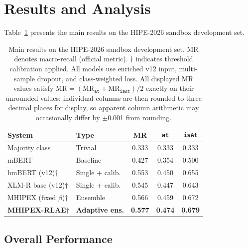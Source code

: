 \documentclass[11pt,a4paper]{article}
\begin{document}
\section{Results and Analysis}
\label{sec:results}

Table~\ref{tab:main} presents the main results on the HIPE-2026 sandbox development set.

\begin{table}[t]
\centering
\caption{Main results on the HIPE-2026 sandbox development set. MR denotes macro-recall (official metric). $\dagger$ indicates threshold calibration applied. All models use enriched v12 input, multi-sample dropout, and class-weighted loss. All displayed MR values satisfy $\text{MR}=(\text{MR}_{\texttt{at}}+\text{MR}_{\texttt{isAt}})/2$ exactly on their unrounded values; individual columns are then rounded to three decimal places for display, so apparent column arithmetic may occasionally differ by $\pm$0.001 from rounding.}
\label{tab:main}
\begin{tabular}{llccc}
\toprule
\textbf{System} & \textbf{Type} & \textbf{MR} & \textbf{\texttt{at}} & \textbf{\texttt{isAt}} \\
\midrule
Majority class & Trivial & 0.333 & 0.333 & 0.333 \\
mBERT & Baseline & 0.427 & 0.354 & 0.500 \\
\midrule
hmBERT (v12)$\dagger$ & Single + calib. & 0.553 & 0.450 & 0.655 \\
XLM-R base (v12)$\dagger$ & Single + calib. & 0.545 & 0.447 & 0.643 \\
\midrule
MHIPEX (fixed $\beta$)$\dagger$ & Ensemble & 0.566 & 0.459 & 0.672 \\
\textbf{MHIPEX-RLAE}$\dagger$ & \textbf{Adaptive ens.} & \textbf{0.577} & \textbf{0.474} & \textbf{0.679} \\
\bottomrule
\end{tabular}
\end{table}

\subsection{Overall Performance}
\end{document}
